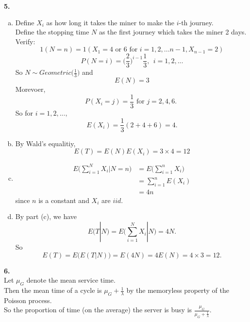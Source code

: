\documentclass{amsart}
\theoremstyle{plain}
\theoremstyle{definition}
\begin{document}
\vspace{5mm}

\noindent \textbf{5.} 
\begin{enumerate}[(a)]
	\item
		Define $X_i$ as how long it takes the miner to make the $i$-th journey. \\
		Define the stopping time $N$ as the first journey which takes the miner 2 days.\\ 
		Verify: 
		\[1(N=n) = 1(X_1 = 4\text{ or }6 \text{ for } i = 1,2,...n-1, X_{n-1} = 2)	\]		 
		\[P(N=i) = \Big({\frac{2}{3}}\Big)^{i-1}\frac{1}{3},\ \ i = 1,2,...\]
		So $N\sim Geometric\Big(\frac{1}{3}\Big)$ and  
		\[E(N) = 3\]
		Morevoer,
		\[ P(X_i = j) = \frac{1}{3}\text{ for $j=2,4,6$. } \]
		So for $i=1,2,...,$
		\[E(X_i) = \frac{1}{3}(2+4+6) = 4.\]
	\item
		By Wald's equalitiy,
		\[ E(T)  = E(N)E(X_i) = 3\times 4 = 12\]
	\item
		\begin{align*}
			E\Bigg(\sum_{i=1}^NX_i|N=n\Bigg) &= E\Bigg(\sum_{i=1}^nX_i\Bigg )\\
											 &=\sum_{i=1}^nE(X_i)\\
											 &=4n
		\end{align*}
		since $n$ is a constant and $X_i$ are $iid$.\\
	\item
		By part (c), we have 
		\[E(T|N) = E\Bigg(\sum_{i=1}^NX_i|N\Bigg) =4N.\]
		So
		\[ E(T)= E\big(E(T|N)\big) = E(4N) = 4E(N) = 4\times 3 = 12. \]
\end{enumerate}

\vspace{5mm}

\noindent \textbf{6.} \\
Let $\mu_G$ denote the mean service time.\\
Then the mean time of a cycle is $\mu_G + \frac{1}{\lambda}$ by the memoryless property of the Poisson process.\\
So the proportion of time (on the average) the server is busy is $\frac{\mu_G}{\mu_G + \frac{1}{\lambda}}$.
\end{document}
